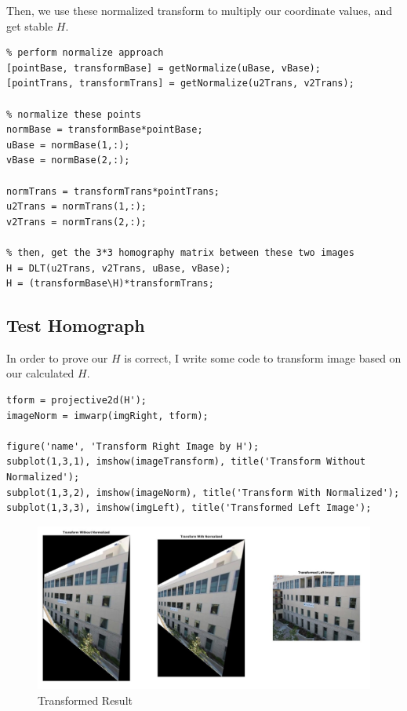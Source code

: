 \documentclass[12pt]{article}
\begin{document}
Then, we use these normalized transform to multiply our coordinate values, and get stable $H$.

\begin{lstlisting}
% perform normalize approach
[pointBase, transformBase] = getNormalize(uBase, vBase);
[pointTrans, transformTrans] = getNormalize(u2Trans, v2Trans);

% normalize these points
normBase = transformBase*pointBase;
uBase = normBase(1,:);
vBase = normBase(2,:);

normTrans = transformTrans*pointTrans;
u2Trans = normTrans(1,:);
v2Trans = normTrans(2,:);

% then, get the 3*3 homography matrix between these two images
H = DLT(u2Trans, v2Trans, uBase, vBase);
H = (transformBase\H)*transformTrans;
\end{lstlisting}

\subsection{Test Homograph}

In order to prove our $H$ is correct, I write some code to transform image based on our calculated $H$.

\begin{lstlisting}
tform = projective2d(H');
imageNorm = imwarp(imgRight, tform);

figure('name', 'Transform Right Image by H');
subplot(1,3,1), imshow(imageTransform), title('Transform Without Normalized');
subplot(1,3,2), imshow(imageNorm), title('Transform With Normalized');
subplot(1,3,3), imshow(imgLeft), title('Transformed Left Image');
\end{lstlisting}

\begin{figure}[h]
    \centering
    \includegraphics[width=1\textwidth]{TransformResult.jpg}
    \caption{Transformed Result}
    \label{fig:TransformResult}
\end{figure}
\end{document}
